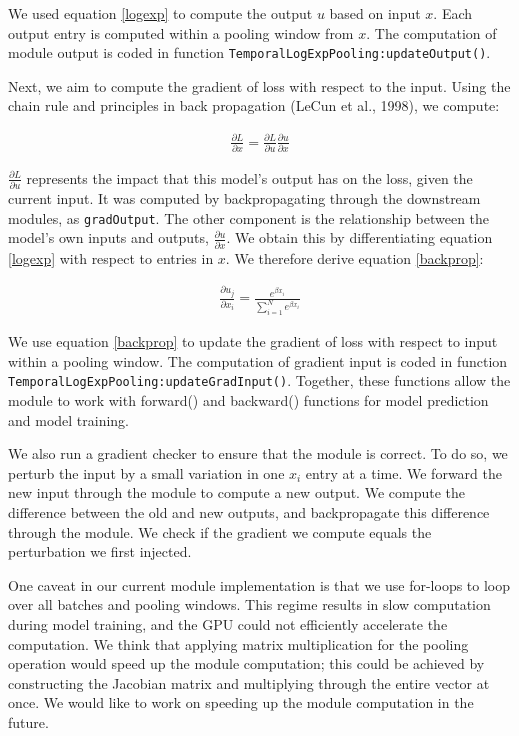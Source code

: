 \documentclass{article}
\begin{document}
We used equation \ref{logexp} to compute the output $u$ based on input $x$. Each output entry is computed within a pooling window from $x$. The computation of module output is coded in function \texttt{TemporalLogExpPooling:updateOutput()}. 

Next, we aim to compute the gradient of loss with respect to the input. Using the chain rule and principles in back propagation (LeCun et al., 1998), we compute:

\begin{align}
\frac{\partial L}{\partial x} = \frac{\partial L}{\partial u} \frac{\partial u}{\partial x}
\label{chainrule}
\end{align}

$\frac{\partial L}{\partial u}$ represents the impact that this model's output has on the loss, given the current input. It was computed by backpropagating through the downstream modules, as \texttt{gradOutput}. The other component is the relationship between the model's own inputs and outputs, $\frac{\partial u}{\partial x}$. We obtain this by differentiating equation \ref{logexp} with respect to entries in $x$. We therefore derive equation \ref{backprop}:

\begin{align}
\frac{\partial u_j}{\partial x_i} = \frac{e^{\beta x_i}}{\sum\limits_{i=1}^{N} e^{\beta x_i}}
\label{backprop}
\end{align}

We use equation \ref{backprop} to update the gradient of loss with respect to input within a pooling window. The computation of gradient input is coded in function \texttt{TemporalLogExpPooling:updateGradInput()}. Together, these functions allow the module to work with forward() and backward() functions for model prediction and model training. 

We also run a gradient checker to ensure that the module is correct. To do so, we perturb the input by a small variation in one $x_i$ entry at a time. We forward the new input through the module to compute a new output. We compute the difference between the old and new outputs, and backpropagate this difference through the module. We check if the gradient we compute equals the perturbation we first injected. 

One caveat in our current module implementation is that we use for-loops to loop over all batches and pooling windows. This regime results in slow computation during model training, and the GPU could not efficiently accelerate the computation. We think that applying matrix multiplication for the pooling operation would speed up the module computation; this could be achieved by constructing the Jacobian matrix and multiplying through the entire vector at once. We would like to work on speeding up the module computation in the future. 
\end{document}
